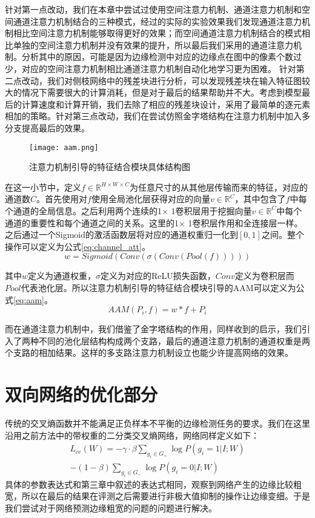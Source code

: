 \documentclass[master]{thesis-uestc}
\begin{document}
{针对第一点改动，我们在本章中尝试过使用空间注意力机制、通道注意力机制和空间通道注意力机制结合的三种模式，经过的实际的实验效果我们发现通道注意力机制相比空间注意力机制能够取得更好的效果；而空间通道注意力机制结合的模式相比单独的空间注意力机制并没有效果的提升，所以最后我们采用的通道注意力机制。分析其中的原因，可能是因为边缘检测中对应的边缘点在图中的像素个数过少，对应的空间注意力机制相比通道注意力机制自动化地学习更为困难。 针对第二点改动，我们对侧枝网络中的残差块进行分析，可以发现残差块在输入特征图较大的情况下需要很大的计算消耗，但是对于最后的结果帮助并不大。考虑到模型最后的计算速度和计算开销，我们去除了相应的残差块设计，采用了最简单的逐元素相加的策略。针对第三点改动，我们在尝试仿照金字塔结构在注意力机制中加入多分支提高最后的效果。
\begin{figure}[h!]
    \texttt{[image: aam.png]}
    \caption{注意力机制引导的特征结合模块具体结构图}
    \label{aam}
\end{figure}

在这一小节中，定义$f\in \mathbb{R}^{H \times W \times C}$为任意尺寸的从其他层传输而来的特征，对应的通道数$C$。首先使用对$f$使用全局池化层获得对应的向量$v \in \mathbb{R}^{C}$，其中包含了$f$中每个通道的全局信息。之后利用两个连续的1$ \times$ 1卷积层用于挖掘向量$v \in \mathbb{R}^{C}$中每个通道的重要性和每个通道之间的关系。这里的1$ \times$ 1卷积层作用和全连接层一样。之后通过一个Sigmoid的激活函数层将对应的通道权重归一化到$[0,1]$之间。整个操作可以定义为公式\eqref{eq:channel_att}。
\begin{equation}
    w = Sigmoid(Conv(\sigma (Conv(Pool(f)))))
    \label{eq:channel_att}
\end{equation}

其中$w$定义为通道权重，$\sigma$定义为对应的ReLU损失函数，$Conv$定义为卷积层而$Pool$代表池化层。所以注意力机制引导的特征结合模块引导的AAM可以定义为公式\eqref{eq:aam}。
\begin{equation}
    AAM(P_{i}, f) = w * f + P_{i}
    \label{eq:aam}
\end{equation}

而在通道注意力机制中，我们借鉴了金字塔结构的作用，同样收到的启示，我们引入了两种不同的池化层结构构成两个支路，最后的通道注意力机制的通道权重是两个支路的相加结果。这样的多支路注意力机制设立也能少许提高网络的效果。


\section{双向网络的优化部分}
传统的交叉熵函数并不能满足正负样本不平衡的边缘检测任务的要求。我们在这里沿用之前方法中的带权重的二分类交叉熵网络，网络同样定义如下：
\begin{equation}
\begin{aligned}
L_{ce}(W) = -\gamma \cdot \beta \sum\nolimits_{g_{i} \in G_{+}}\log P(g_{i} = 1 | I ; W) \\
- (1 - \beta) \sum\nolimits_{g_{i}\in G_{-}}\log P(g_{i} = 0 | I ; W)
\end{aligned}
\end{equation}
具体的参数表达式和第三章中叙述的表达式相同，观察到网络产生的边缘比较粗宽，所以在最后的结果在评测之后需要进行非极大值抑制的操作让边缘变细。于是我们尝试对于网络预测边缘粗宽的问题的问题进行解决。

}
\end{document}
